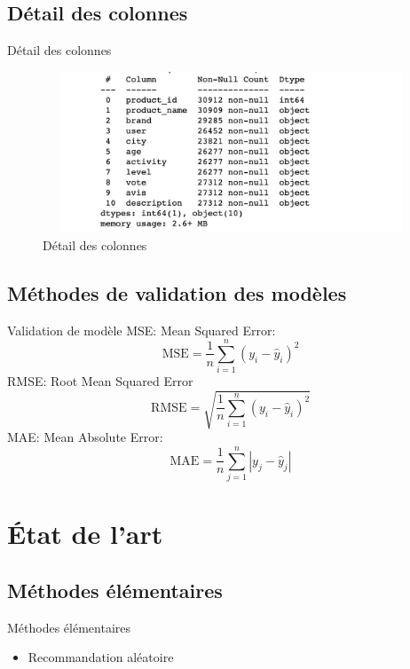 \documentclass[xelatex,12pt]{beamer}
\begin{document}
\subsection{Détail des colonnes}
\begin{frame}{Détail des colonnes}
\begin{figure}[h]
\begin{center}
\includegraphics[width=12cm,height=4.8cm]{images/detail_columns.jpeg}
\caption[Détail des colonnes]{Détail des colonnes}
\label{monlabel}
\end{center}
\end{figure}
\end{frame}

\subsection{Méthodes de validation des modèles}
\begin{frame}{Validation de modèle}
MSE: Mean Squared Error:
$$
\mathrm{MSE}=\frac{1}{n} \sum_{i=1}^n\left(y_i-\hat{y}_i\right)^2
$$
RMSE: Root Mean Squared Error
$$
\mathrm{RMSE}=\sqrt{\frac{1}{n} \sum_{i=1}^n\left(y_i-\hat{y}_i\right)^2}
$$
MAE: Mean Absolute Error:
$$\mathrm{MAE}=\frac{1}{n} \sum_{j=1}^n\left|y_j-\hat{y}_j\right|
$$
\end{frame}



\section{État de l'art}
\subsection{Méthodes élémentaires}
\begin{frame}{Méthodes élémentaires}
\begin{itemize}
  \item Recommandation aléatoire
  \end{itemize}
\end{frame}
\end{document}
